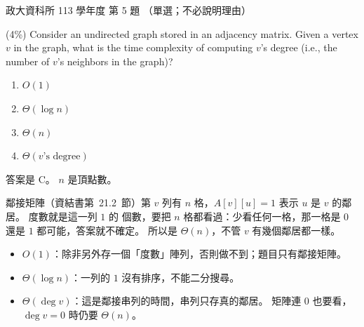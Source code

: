 \begin{pastexam}[label={px:nccu-113-dsa-05}]{政大資科所 113 學年度 第 5 題}
（單選；不必說明理由）

(4\%) Consider an undirected graph stored in an adjacency matrix. Given a vertex $v$ in the graph, what is
the time complexity of computing $v$'s degree (i.e., the number of $v$'s neighbors in the graph)?
\begin{enumerate}[label=\Alph*.]
\item $O(1)$
\item $\Theta(\log n)$
\item $\Theta(n)$
\item $\Theta(v\text{'s degree})$
\end{enumerate}
\end{pastexam}

\begin{pastsoln}
答案是 C。 $n$ 是頂點數。

鄰接矩陣（資結書第~21.2~節）第 $v$ 列有 $n$ 格，$A[v][u] = 1$ 表示 $u$ 是 $v$ 的鄰居。 度數就是這一列 $1$ 的
個數，要把 $n$ 格都看過：少看任何一格，那一格是 $0$ 還是 $1$ 都可能，答案就不確定。 所以是 $\Theta(n)$，不管
$v$ 有幾個鄰居都一樣。

\begin{itemize}
\item[A.] $O(1)$：除非另外存一個「度數」陣列，否則做不到；題目只有鄰接矩陣。
\item[B.] $\Theta(\log n)$：一列的 $1$ 沒有排序，不能二分搜尋。
\item[D.] $\Theta(\deg v)$：這是鄰接串列的時間，串列只存真的鄰居。 矩陣連 $0$ 也要看，$\deg v = 0$ 時仍要
$\Theta(n)$。
\end{itemize}
\end{pastsoln}
